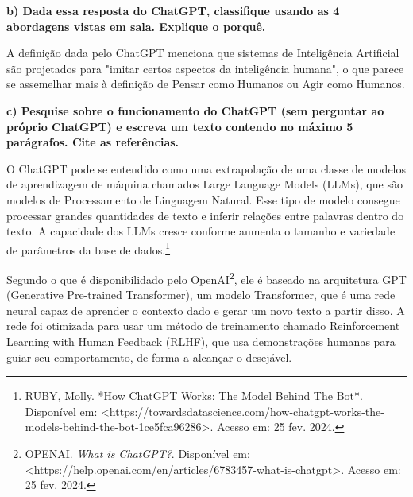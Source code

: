 \begin{adjustwidth}{1em}{}
\textbf{b) Dada essa resposta do ChatGPT, classifique usando as 4 abordagens vistas em
sala. Explique o porquê.}
\end{adjustwidth}

A definição dada pelo ChatGPT menciona que sistemas de Inteligência Artificial são projetados para "imitar certos aspectos da inteligência humana", o que parece se assemelhar mais à definição de Pensar como Humanos ou Agir como Humanos.

\begin{adjustwidth}{1em}{}
\textbf{c) Pesquise sobre o funcionamento do ChatGPT (sem perguntar ao próprio
ChatGPT) e escreva um texto contendo no máximo 5 parágrafos. Cite as referências.}
\end{adjustwidth}

O ChatGPT pode se entendido como uma extrapolação de uma classe de modelos de aprendizagem de máquina chamados Large Language Models (LLMs), que são modelos de Processamento de Linguagem Natural. Esse tipo de modelo consegue processar grandes quantidades de texto e inferir relações entre palavras dentro do texto. A capacidade dos LLMs cresce conforme aumenta o tamanho e variedade de parâmetros da base de dados.\footnote{RUBY, Molly. *How ChatGPT Works: The Model Behind The Bot*. Disponível em: <https://towardsdatascience.com/how-chatgpt-works-the-models-behind-the-bot-1ce5fca96286>. Acesso em: 25 fev. 2024.}

Segundo o que é disponibilidado pelo OpenAI\footnote{OPENAI. \textit{What is ChatGPT?}. Disponível em: <https://help.openai.com/en/articles/6783457-what-is-chatgpt>. Acesso em: 25 fev. 2024.}, ele é baseado na arquitetura GPT (Generative Pre-trained Transformer), um modelo Transformer, que é uma rede neural capaz de aprender o contexto dado e gerar um novo texto a partir disso. A rede foi otimizada para usar um método de treinamento chamado Reinforcement Learning with Human Feedback (RLHF), que usa demonstrações humanas para guiar seu comportamento, de forma a alcançar o desejável.

